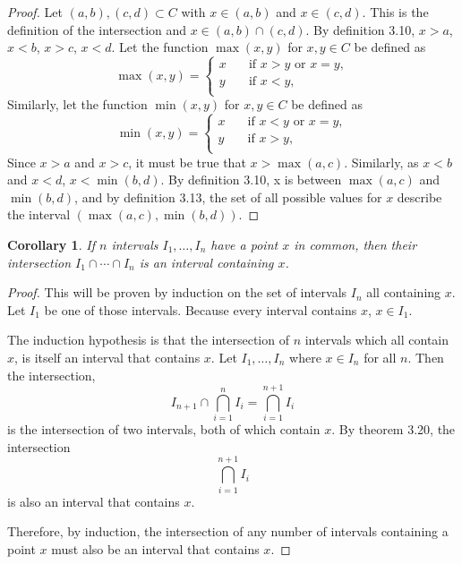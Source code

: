 \documentclass{amsart}
\newtheorem{corollary}[theorem]{Corollary}
\newcommand{\1}{\mathds{1}}
\numberwithin{equation}{section}
\numberwithin{theorem}{section}
\begin{document}
\begin{proof}
	Let $(a,b),(c,d)\subset C$ with $x\in (a,b)$ and $x\in (c,d)$. This is the definition of the intersection and $x\in (a,b)\cap (c,d)$. By definition 3.10, $x>a$, $x<b$, $x>c$, $x<d$. Let the function $\max(x,y)$ for $x,y\in C$ be defined as
	\[\max(x,y) = \begin{cases}
		x \quad &\text{if } x>y \text{ or } x =y,\\
		y \quad &\text{if } x<y,\\
	\end{cases}\]
	Similarly, let the function $\min(x,y)$ for $x,y\in C$ be defined as 
	\[\min(x,y) = \begin{cases}
		x \quad &\text{if } x<y \text{ or } x =y,\\
		y \quad &\text{if } x>y,\\
	\end{cases}\]
	Since $x>a$ and $x>c$, it must be true that $x>\max(a,c)$. Similarly, as $x<b$ and $x<d$, $x<\min(b,d)$. By definition 3.10, x is between $\max(a,c)$ and $\min(b,d)$, and by definition 3.13, the set of all possible values for $x$ describe the interval $(\max(a,c),\min(b,d))$.
\end{proof}

\begin{corollary}\label{c.interval_intersection}
	If $n$ intervals $I_1, \dotsc, I_n$ have a point $x$ in common, then their intersection $I_1 \cap \dotsm \cap I_n$ is an interval containing $x$.
\end{corollary}
	
\begin{proof}
	This will be proven by induction on the set of intervals $I_n$ all containing $x$. Let $I_1$ be one of those intervals. Because every interval contains $x$, $x\in I_1$. 
	
	The induction hypothesis is that the intersection of $n$ intervals which all contain $x$, is itself an interval that contains $x$. Let $I_1, \dotsc, I_n$  where $x\in I_n$ for all $n$. Then the intersection, 
	$$I_{n+1} \cap \bigcap_{i=1}^n I_i = \bigcap_{i=1}^{n+1} I_i$$ is the intersection of two intervals, both of which contain $x$. By theorem 3.20, the intersection $$\bigcap_{i=1}^{n+1} I_i$$ is also an interval that contains $x$. 
	
	Therefore, by induction, the intersection of any number of intervals containing a point $x$ must also be an interval that contains $x$.
\end{proof}
\end{document}
